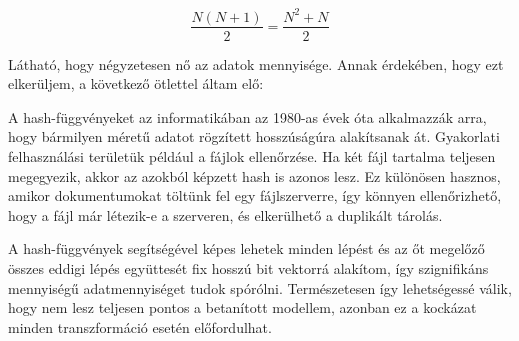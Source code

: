 \[\frac{N(N+1)}{2} = \frac{N^2+N}{2}\]

Látható, hogy négyzetesen nő az adatok mennyisége. Annak érdekében, hogy ezt elkerüljem, a következő ötlettel áltam elő:

A hash-függvényeket az informatikában az 1980-as évek óta alkalmazzák arra, hogy bármilyen méretű adatot rögzített hosszúságúra alakítsanak át. 
Gyakorlati felhasználási területük például a fájlok ellenőrzése. Ha két fájl tartalma teljesen megegyezik, akkor az azokból képzett hash is azonos lesz. Ez különösen hasznos, amikor dokumentumokat töltünk fel egy fájlszerverre, így könnyen ellenőrizhető, hogy a fájl már létezik-e a szerveren, és elkerülhető a duplikált tárolás.

A hash-függvények segítségével képes lehetek minden lépést és az őt megelőző összes eddigi lépés együttesét  fix hosszú bit vektorrá alakítom, így szignifikáns mennyiségű adatmennyiséget tudok spórólni. 
Természetesen így lehetségessé válik, hogy nem lesz teljesen pontos a betanított modellem, azonban ez a kockázat minden transzformáció esetén előfordulhat. 


